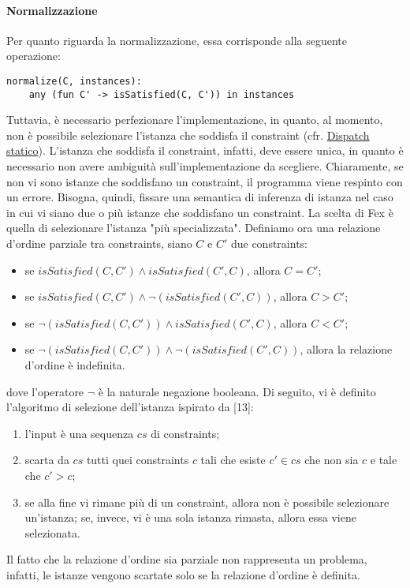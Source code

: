 \documentclass[10pt,a4paper]{article}
\begin{document}
\hypertarget{Normalizzazione}{\paragraph{Normalizzazione}}
Per quanto riguarda la normalizzazione, essa corrisponde alla seguente operazione:
\begin{lstlisting}
normalize(C, instances):
    any (fun C' -> isSatisfied(C, C')) in instances
\end{lstlisting}
Tuttavia, è necessario perfezionare l'implementazione, in quanto, al momento, non è possibile selezionare l'istanza
che soddisfa il constraint (cfr. \hyperlink{Dispatch statico}{Dispatch statico}). L'istanza che soddisfa il constraint,
infatti, deve essere unica,
in quanto è necessario non avere ambiguità sull'implementazione da scegliere. Chiaramente, se non vi sono istanze
che soddisfano un constraint, il programma viene respinto con un errore. Bisogna, quindi, fissare una semantica
di inferenza di istanza nel caso in cui vi siano due o più istanze che soddisfano un constraint. La scelta di Fex è
quella di selezionare l'istanza "più specializzata". Definiamo ora una relazione d'ordine parziale tra constraints,
siano $ C $ e $ C' $ due constraints:
\begin{itemize}
    \item se $ isSatisfied(C, C') \wedge isSatisfied(C', C) $, allora $ C = C' $;
    \item se $ isSatisfied(C, C') \wedge \neg(isSatisfied(C', C)) $, allora $ C > C' $;
    \item se $ \neg(isSatisfied(C, C')) \wedge isSatisfied(C', C) $, allora $ C < C' $;
    \item se $ \neg(isSatisfied(C, C')) \wedge \neg(isSatisfied(C', C)) $, allora la relazione d'ordine è indefinita.
\end{itemize}
dove l'operatore $ \neg $ è la naturale negazione booleana. Di seguito, vi è definito l'algoritmo di selezione dell'istanza
ispirato da [13]:
\begin{enumerate}
    \item l'input è una sequenza $ cs $ di constraints;
    \item scarta da $ cs $ tutti quei constraints $ c $ tali che esiste $ c' \in cs $ che non sia $ c $ e tale che
    $ c' > c $;
    \item se alla fine vi rimane più di un constraint, allora non è possibile selezionare un'istanza; se, invece, vi
    è una sola istanza rimasta, allora essa viene selezionata.
\end{enumerate}
Il fatto che la relazione d'ordine sia parziale non rappresenta un problema, infatti, le istanze vengono scartate solo
se la relazione d'ordine è definita.
\end{document}
